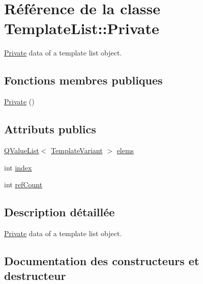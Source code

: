 \hypertarget{class_template_list_1_1_private}{}\section{Référence de la classe Template\+List\+:\+:Private}
\label{class_template_list_1_1_private}


\hyperlink{class_template_list_1_1_private}{Private} data of a template list object.  


\subsection*{Fonctions membres publiques}
\begin{DoxyCompactItemize}
\item 
\hyperlink{class_template_list_1_1_private_a4b1d7bb0f28a920c7624623f34b6b788}{Private} ()
\end{DoxyCompactItemize}
\subsection*{Attributs publics}
\begin{DoxyCompactItemize}
\item 
\hyperlink{class_q_value_list}{Q\+Value\+List}$<$ \hyperlink{class_template_variant}{Template\+Variant} $>$ \hyperlink{class_template_list_1_1_private_acc04f917dcef1551fe158ced2e460634}{elems}
\item 
int \hyperlink{class_template_list_1_1_private_ac9f06bb46854c943324ba962864bf8e4}{index}
\item 
int \hyperlink{class_template_list_1_1_private_a749f4c55c79d45744976a305bd6958a9}{ref\+Count}
\end{DoxyCompactItemize}


\subsection{Description détaillée}
\hyperlink{class_template_list_1_1_private}{Private} data of a template list object. 

\subsection{Documentation des constructeurs et destructeur}
\hypertarget{class_template_list_1_1_private_a4b1d7bb0f28a920c7624623f34b6b788}{}
